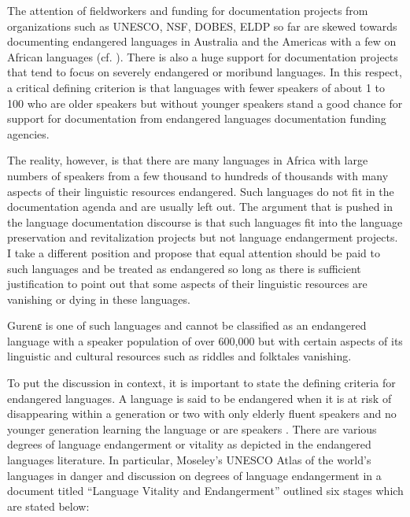 \documentclass[output=paper,colorlinks,citecolor=brown]{langscibook}
\begin{document}
The attention of fieldworkers and funding for documentation projects from organizations such as UNESCO, NSF, DOBES, ELDP so far are skewed towards documenting endangered languages in Australia and the Americas with a few on African languages (cf. \citealt{EssegbeyEtAl2015}).  There is also a huge support for documentation projects that tend to focus on severely endangered or moribund languages. In this respect, a critical defining criterion is that languages with fewer speakers of about 1 to 100 who are older speakers but without younger speakers stand a good chance for support for documentation from endangered languages documentation funding agencies. 

The reality, however, is that there are many languages in Africa with large numbers of speakers from a few thousand to hundreds of thousands with many aspects of their linguistic resources endangered. Such languages do not fit in the documentation agenda and are usually left out. The argument that is pushed in the language documentation discourse is that such languages fit into the language preservation and revitalization projects but not language endangerment projects. I take a different position and propose that equal attention should be paid to such languages and be treated as endangered so long as there is sufficient justification to point out that some aspects of their linguistic resources are vanishing or dying in these languages. 

Gurenɛ is one of such languages and cannot be classified as an endangered language with a speaker population of over 600,000 but with certain aspects of its linguistic and cultural resources such as riddles and folktales vanishing. 

To put the discussion in context, it is important to state the defining criteria for endangered languages.  A language is said to be endangered when it is at risk of disappearing within a generation or two with only elderly fluent speakers and no younger generation learning the language or are speakers \citet[4]{Thomason2015}. There are various degrees of language endangerment or vitality as depicted in the endangered languages literature. In particular, Moseley’s \citep{Moseley2012} UNESCO Atlas of the world’s languages in danger and  discussion on degrees of language endangerment in a document titled “Language Vitality and Endangerment” outlined six stages which are stated below:
\end{document}
